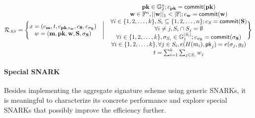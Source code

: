 \begin{equation*}
    \mathcal{R}_{AS} = 
\Bigg\{\space \begin{matrix}
         x = (c_{\mathbf{m}}, t,  c_{\mathbf{pk}, c_{\mathbf{w}}}, c_{\mathbf{S}}, c_{\mathbf{\sigma}_{\mathbf{S}}})\\
         w = (\mathbf{m}, \mathbf{pk}, \mathbf{w}, \mathbf{S}, \mathbf{\sigma_S})\\
    \end{matrix}\quad \Bigg| \quad \begin{matrix}
        \mathbf{pk}\in \mathbb{G}_2^n; c_{\mathbf{pk}} = \mathsf{commit}(\mathbf{pk})\\
        \mathbf{w}\in \mathbb{F}^n, ||\mathbf{w}||_1<|\mathbb{F}|;  c_{\mathbf{w}} = \mathsf{commit}(\mathbf{w})\\
        \forall i\in \{1,2,\dots, k\}, S_i\subseteq \{1,2,\dots, n\}; c_{S} = \mathsf{commit}(\mathbf{S})\\
        \forall i\neq j, S_i \cap S_j = \emptyset \\
        \forall i\in \{1,2,\dots, k\}, \mathbf{\sigma}_{S_i} \in \mathbb{G}_1^{|S_i|} ;c_{\mathbf{\sigma_{S}}} = \mathsf{commit}(\mathbf{\sigma_S}) \\
        \forall i\in \{1,2,\dots, k\}, \forall j\in S_i, e(H(m_i), \mathsf{pk}_j) = e(\sigma_j, g_2) \\
        t = \sum_{i=1}^k \sum_{j\in S_i} w_j  \\
    \end{matrix}\space \Bigg\}
\end{equation*}

\paragraph{Special SNARK} Besides implementing the aggregate signature scheme using generic SNARKs, it is meaningful to characterize its concrete performance and explore special SNARKs that possibly improve the efficiency further. 